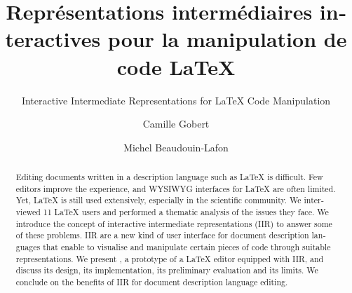 \documentclass[manuscript,authordraft]{acmart}
\newcommand{\en}[1]{\foreignlanguage{english}{#1}}
\newcommand{\fr}[1]{\foreignlanguage{french}{#1}}
\begin{document}
\sloppy

\def\titreFR{Représentations intermédiaires interactives pour la manipulation de code \LaTeX{}}
\def\titreEN{Interactive Intermediate Representations for \LaTeX{} Code Manipulation}
\def\titreSHORT{} %

\title[\fr{\titreSHORT}]{\fr{\titreFR}}
\subtitle{\en{\titreEN}}

\author{Camille Gobert}

\author{Michel Beaudouin-Lafon}



\begin{abstract} %
\en{
Editing documents written in a description language such as \LaTeX{} is difficult. Few editors improve the experience, and WYSIWYG interfaces for \LaTeX{} are often limited. Yet, \LaTeX{} is still used extensively, especially in the scientific community. We interviewed 11 \LaTeX{} users and performed a thematic analysis of the issues they face. We introduce the concept of interactive intermediate representations (IIR) to answer some of these problems. IIR are a new kind of user interface for document description languages that enable to visualise and manipulate certain pieces of code through suitable representations. We present \iLaTeX{}, a prototype of a \LaTeX{} editor equipped with IIR, and discuss its design, its implementation, its preliminary evaluation and its limits. We conclude on the benefits of IIR for document description language editing.
}
\end{abstract}
\end{document}
